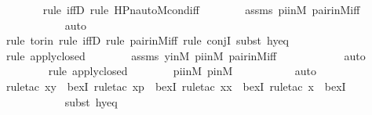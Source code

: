 \begin{isabellebody}
\ \ \ \ \ \ \isamarkupfalse%
{\isacharparenleft}{\kern0pt}rule\ iffD{}{\isacharcomma}{\kern0pt}\ rule\ HPn{\isacharunderscore}{\kern0pt}auto{\isacharunderscore}{\kern0pt}M{\isacharunderscore}{\kern0pt}cond{\isacharunderscore}{\kern0pt}iff{\isacharparenright}{\kern0pt}\isanewline
\ \ \ \ \ \ \isamarkupfalse%
\ assms{}\ piinM\ pair{\isacharunderscore}{\kern0pt}in{\isacharunderscore}{\kern0pt}M{\isacharunderscore}{\kern0pt}iff\ \isanewline
\ \ \ \ \ \ \ \ \ \isamarkupfalse%
\ auto{\isacharbrackleft}{\kern0pt}{}{\isacharbrackright}{\kern0pt}\isanewline
\ \ \ \ \ \ \ \isamarkupfalse%
{\isacharparenleft}{\kern0pt}rule\ to{\isacharunderscore}{\kern0pt}rin{\isacharcomma}{\kern0pt}\ rule\ iffD{}{\isacharcomma}{\kern0pt}\ rule\ pair{\isacharunderscore}{\kern0pt}in{\isacharunderscore}{\kern0pt}M{\isacharunderscore}{\kern0pt}iff{\isacharcomma}{\kern0pt}\ rule\ conjI{\isacharcomma}{\kern0pt}\ subst\ hyeq{\isacharparenright}{\kern0pt}\isanewline
\ \ \ \ \ \ \ \ \isamarkupfalse%
{\isacharparenleft}{\kern0pt}rule\ apply{\isacharunderscore}{\kern0pt}closed{\isacharparenright}{\kern0pt}\isanewline
\ \ \ \ \ \ \isamarkupfalse%
\ assms{}\ yinM\ piinM\ pair{\isacharunderscore}{\kern0pt}in{\isacharunderscore}{\kern0pt}M{\isacharunderscore}{\kern0pt}iff\ \isanewline
\ \ \ \ \ \ \ \ \ \isamarkupfalse%
\ auto{\isacharbrackleft}{\kern0pt}{}{\isacharbrackright}{\kern0pt}\isanewline
\ \ \ \ \ \ \ \isamarkupfalse%
{\isacharparenleft}{\kern0pt}rule\ apply{\isacharunderscore}{\kern0pt}closed{\isacharparenright}{\kern0pt}\isanewline
\ \ \ \ \ \ \isamarkupfalse%
\ piinM\ pinM\ \isanewline
\ \ \ \ \ \ \ \ \isamarkupfalse%
\ auto{\isacharbrackleft}{\kern0pt}{}{\isacharbrackright}{\kern0pt}\isanewline
\ \ \ \ \ \ \isamarkupfalse%
{\isacharparenleft}{\kern0pt}rule{\isacharunderscore}{\kern0pt}tac\ x{\isacharequal}{\kern0pt}y\ \ bexI{\isacharcomma}{\kern0pt}\ rule{\isacharunderscore}{\kern0pt}tac\ x{\isacharequal}{\kern0pt}p\ \ bexI{\isacharcomma}{\kern0pt}\ rule{\isacharunderscore}{\kern0pt}tac\ x{\isacharequal}{\kern0pt}x\ \ bexI{\isacharcomma}{\kern0pt}\ rule{\isacharunderscore}{\kern0pt}tac\ x{\isacharequal}{\kern0pt}{\isasympi}\ \ bexI{\isacharparenright}{\kern0pt}\isanewline
\ \ \ \ \ \ \ \ \ \ \isamarkupfalse%
{\isacharparenleft}{\kern0pt}subst\ hyeq{\isacharparenright}{\kern0pt}\isanewline

\end{isabellebody}
